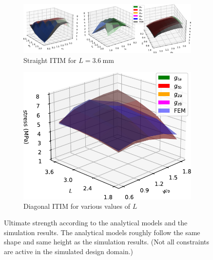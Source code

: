 \begin{figure}
	\centering
	\setlength{\figheight}{.2\textwidth}
	\begin{subfigure}[B]{.7\textwidth}
		\centering
		\includegraphics[height=\figheight]{sources/simulation/model_accuracy.pdf}
		\caption{Straight ITIM for $L=\SI{3.6}{\milli\meter}$}
		\label{fig:ana_sim_accuracy_straight}
	\end{subfigure}
	\hspace{-.5cm}
	\begin{subfigure}[B]{.29\textwidth}
		\centering
		\includegraphics[height=\figheight]{sources/simulation/model_accuracy_diagonal.pdf}
		\caption{Diagonal ITIM for various values of $L$}
		\label{fig:ana_sim_accuracy_diagonal}
	\end{subfigure}
	\caption{Ultimate strength according to the analytical models and the simulation results.
		The analytical models roughly follow the same shape and same height as the simulation results. 
		(Not all constraints are active in the simulated design domain.)
	}
	\label{fig:ana_sim_accuracy}
\end{figure}






